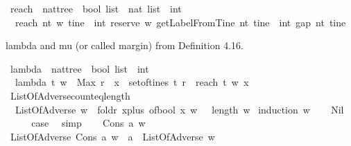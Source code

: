 \begin{isabellebody}
\isamarkupfalse%
\ reach\ {\isacharcolon}{\isacharcolon}\ {\isachardoublequoteopen}nattree\ {\isasymRightarrow}\ bool\ list\ {\isasymRightarrow}\ nat\ list\ {\isasymRightarrow}\ int{\isachardoublequoteclose}\ \isanewline
\ \ {\isachardoublequoteopen}reach\ nt\ w\ tine\ {\isacharequal}\ int\ {\isacharparenleft}reserve\ w\ {\isacharparenleft}getLabelFromTine\ nt\ tine{\isacharparenright}{\isacharparenright}\ {\isacharminus}\ int\ {\isacharparenleft}gap\ nt\ tine{\isacharparenright}{\isachardoublequoteclose}%
\begin{isamarkuptext}%
lambda and mu (or called margin) from Definition 4.16.%
\end{isamarkuptext}\isamarkuptrue%
\isamarkupfalse%
\ lambda\ {\isacharcolon}{\isacharcolon}\ {\isachardoublequoteopen}nattree\ {\isasymRightarrow}\ bool\ list\ {\isasymRightarrow}\ int{\isachardoublequoteclose}\ \isanewline
\ \ {\isachardoublequoteopen}lambda\ t\ w\ {\isacharequal}\ Max\ {\isacharbraceleft}r{\isachardot}\ {\isasymexists}\ x\ {\isasymin}\ set{\isacharunderscore}of{\isacharunderscore}tines\ t{\isachardot}\ r\ {\isacharequal}\ reach\ t\ w\ x{\isacharbraceright}{\isachardoublequoteclose}\isanewline
\isanewline
{}\isamarkupfalse%
\ ListOfAdverse{\isacharunderscore}count{\isacharunderscore}eq{\isacharunderscore}length\ {\isacharcolon}\ \isanewline
\ \ {\isachardoublequoteopen}ListOfAdverse\ w\ {\isasymlongrightarrow}\ {\isacharparenleft}foldr\ {\isacharparenleft}{\isasymlambda}x{\isachardot}{\isacharparenleft}plus\ {\isacharparenleft}of{\isacharunderscore}bool\ x{\isacharparenright}{\isacharparenright}{\isacharparenright}\ w\ {}{\isacharparenright}\ {\isacharequal}\ length\ w{\isachardoublequoteclose}\isanewline
%
\isadelimproof
%
\endisadelimproof
%
\isatagproof
{}\isamarkupfalse%
\ {\isacharparenleft}induction\ w{\isacharparenright}\isanewline
\ \ \isamarkupfalse%
\ Nil\isanewline
\ \ \isamarkupfalse%
\ \isamarkupfalse%
\ {\isacharquery}case\ \isamarkupfalse%
\ simp\isanewline
{}\isamarkupfalse%
\isanewline
\ \ \isamarkupfalse%
\ {\isacharparenleft}Cons\ a\ w{\isacharparenright}\isanewline
\ \ \ \ \isamarkupfalse%
\ {\isachardoublequoteopen}ListOfAdverse\ {\isacharparenleft}Cons\ a\ w{\isacharparenright}\ {\isasymlongrightarrow}\ a\ {\isasymand}\ ListOfAdverse\ w{\isachardoublequoteclose}\isanewline
\ \ \ \ \ \ \isamarkupfalse%

\end{isabellebody}
